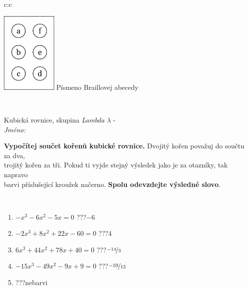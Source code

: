 \documentclass[10pt]{report}
\begin{document}
\begin{tabular}{c:c}
\begin{minipage}[c][104.5mm][t]{0.5\linewidth}
\begin{center}
\begin{minipage}{0.20\linewidth}
\begin{center}
\includegraphics[height=40mm]{../images/braille.png}
{\small Písmeno Braillovej abecedy}
\end{center}
\end{minipage}
\end{center}
\end{minipage}
\\ \hdashline
\begin{minipage}[c][104.5mm][t]{0.5\linewidth}
\begin{center}
\vspace{7mm}
{\huge Kubická rovnice, skupina \textit{Lambda $\lambda$} -}\\[5mm]
\textit{Jméno:}\phantom{xxxxxxxxxxxxxxxxxxxxxxxxxxxxxxxxxxxxxxxxxxxxxxxxxxxxxxxxxxxxxxxxx}\\[5mm]
\begin{minipage}{0.95\linewidth}
\begin{center}
\textbf{Vypočítej součet kořenů kubické rovnice.} Dvojitý kořen považuj do součtu za dva,\\trojitý kořen za tři. Pokud ti vyjde stejný výsledek jako je za otazníky, tak napravo\\barvi příslušející kroužek načerno. \textbf{Spolu odevzdejte výsledné slovo}.
\end{center}
\end{minipage}
\\[1mm]
\begin{minipage}{0.79\linewidth}
\begin{center}
\begin{varwidth}{\linewidth}
\begin{enumerate}
\Large
\item $-x^3-6x^2-5x=0$\quad \dotfill\; ???\;\dotfill \quad $-6$
\item $-2x^3+8x^2+22x-60=0$\quad \dotfill\; ???\;\dotfill \quad $4$
\item $6x^3+44x^2+78x+40=0$\quad \dotfill\; ???\;\dotfill \quad $\nicefrac{-14}{3}$
\item $-15x^3-49x^2-9x+9=0$\quad \dotfill\; ???\;\dotfill \quad $\nicefrac{-59}{15}$
\item \quad \dotfill\; ???\;\dotfill \quad nebarvi

\end{enumerate}
\end{varwidth}
\end{center}
\end{minipage}
\end{center}
\end{minipage}
\end{tabular}
\end{document}
